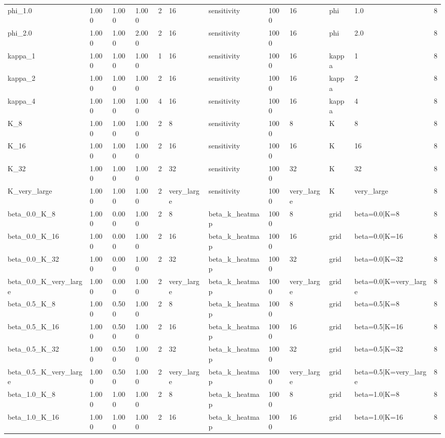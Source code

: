 \begin{tabular}{llllllllllll}
phi\_1.0 & 1.000 & 1.000 & 1.000 & 2 & 16 & sensitivity & 1000 & 16 & phi & 1.0 & 8 \\
phi\_2.0 & 1.000 & 1.000 & 2.000 & 2 & 16 & sensitivity & 1000 & 16 & phi & 2.0 & 8 \\
kappa\_1 & 1.000 & 1.000 & 1.000 & 1 & 16 & sensitivity & 1000 & 16 & kappa & 1 & 8 \\
kappa\_2 & 1.000 & 1.000 & 1.000 & 2 & 16 & sensitivity & 1000 & 16 & kappa & 2 & 8 \\
kappa\_4 & 1.000 & 1.000 & 1.000 & 4 & 16 & sensitivity & 1000 & 16 & kappa & 4 & 8 \\
K\_8 & 1.000 & 1.000 & 1.000 & 2 & 8 & sensitivity & 1000 & 8 & K & 8 & 8 \\
K\_16 & 1.000 & 1.000 & 1.000 & 2 & 16 & sensitivity & 1000 & 16 & K & 16 & 8 \\
K\_32 & 1.000 & 1.000 & 1.000 & 2 & 32 & sensitivity & 1000 & 32 & K & 32 & 8 \\
K\_very\_large & 1.000 & 1.000 & 1.000 & 2 & very\_large & sensitivity & 1000 & very\_large & K & very\_large & 8 \\
beta\_0.0\_K\_8 & 1.000 & 0.000 & 1.000 & 2 & 8 & beta\_k\_heatmap & 1000 & 8 & grid & beta=0.0|K=8 & 8 \\
beta\_0.0\_K\_16 & 1.000 & 0.000 & 1.000 & 2 & 16 & beta\_k\_heatmap & 1000 & 16 & grid & beta=0.0|K=16 & 8 \\
beta\_0.0\_K\_32 & 1.000 & 0.000 & 1.000 & 2 & 32 & beta\_k\_heatmap & 1000 & 32 & grid & beta=0.0|K=32 & 8 \\
beta\_0.0\_K\_very\_large & 1.000 & 0.000 & 1.000 & 2 & very\_large & beta\_k\_heatmap & 1000 & very\_large & grid & beta=0.0|K=very\_large & 8 \\
beta\_0.5\_K\_8 & 1.000 & 0.500 & 1.000 & 2 & 8 & beta\_k\_heatmap & 1000 & 8 & grid & beta=0.5|K=8 & 8 \\
beta\_0.5\_K\_16 & 1.000 & 0.500 & 1.000 & 2 & 16 & beta\_k\_heatmap & 1000 & 16 & grid & beta=0.5|K=16 & 8 \\
beta\_0.5\_K\_32 & 1.000 & 0.500 & 1.000 & 2 & 32 & beta\_k\_heatmap & 1000 & 32 & grid & beta=0.5|K=32 & 8 \\
beta\_0.5\_K\_very\_large & 1.000 & 0.500 & 1.000 & 2 & very\_large & beta\_k\_heatmap & 1000 & very\_large & grid & beta=0.5|K=very\_large & 8 \\
beta\_1.0\_K\_8 & 1.000 & 1.000 & 1.000 & 2 & 8 & beta\_k\_heatmap & 1000 & 8 & grid & beta=1.0|K=8 & 8 \\
beta\_1.0\_K\_16 & 1.000 & 1.000 & 1.000 & 2 & 16 & beta\_k\_heatmap & 1000 & 16 & grid & beta=1.0|K=16 & 8 \\

\end{tabular}
